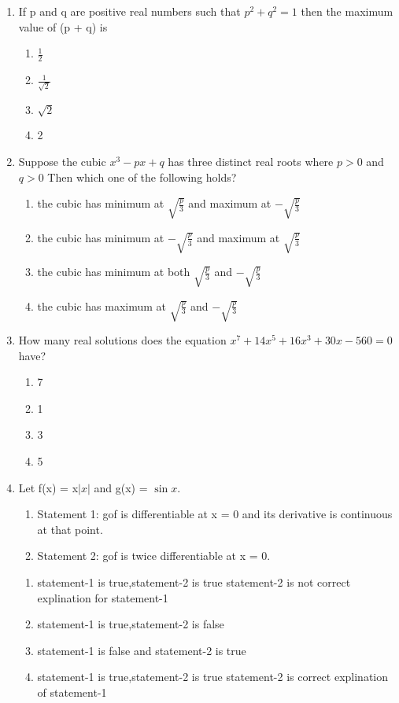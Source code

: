 \begin{enumerate}[label=\arabic*.,ref=\thesubsection.\theenumi]
\item If p and q are positive real numbers such that $p^2 + q^2 = 1$ then the maximum value of (p + q) is
\begin{enumerate}
\item $\frac{1}{2}$
\item $\frac{1}{\sqrt{2}}$
\item $\sqrt{2}$
\item 2
\end{enumerate}

\item Suppose the cubic $x^3 - px + q$ has three distinct real roots where $p > 0$ and $q > 0$ Then which one of the following holds?
\begin{enumerate}
\item the cubic has minimum at $\sqrt{\frac{p}{3}}$ and maximum at $-\sqrt{\frac{p}{3}}$
\item the cubic has minimum at $-\sqrt{\frac{p}{3}}$ and maximum at $\sqrt{\frac{p}{3}}$
\item the cubic has minimum at both  $\sqrt{\frac{p}{3}}$ and $-\sqrt{\frac{p}{3}}$
\item the cubic has maximum at $\sqrt{\frac{p}{3}}$ and  $-\sqrt{\frac{p}{3}}$
\end{enumerate}

\item How many real solutions does the equation $x^7 + 14x^5 + 16x^3 + 30x - 560 = 0$ have?
\begin{enumerate}
\item 7
\item 1
\item 3
\item 5
\end{enumerate}

\item Let f(x) = x$|x|$ and g(x) = $\sin x$.
\begin{enumerate}
\item Statement 1: gof is differentiable at x = 0 and its derivative is continuous at that point.
\item Statement 2: gof is twice differentiable at x = 0.
\end{enumerate}
\begin{enumerate}
\item statement-1 is true,statement-2 is true statement-2 is not correct explination for statement-1
\item statement-1 is true,statement-2 is false 
\item statement-1 is false and statement-2 is true 
\item statement-1 is true,statement-2 is true statement-2 is correct explination of statement-1
\end{enumerate}


\end{enumerate}
